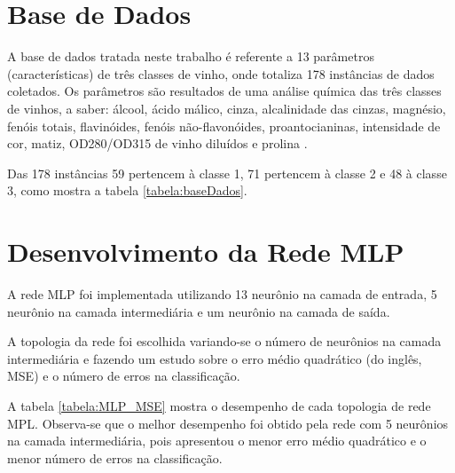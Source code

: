 
\section{Base de Dados} \label{baseDados}

A base de dados tratada neste trabalho é referente a 13 parâmetros (características) de três classes de vinho, onde totaliza 178 instâncias de dados coletados. Os parâmetros são resultados de uma análise química das três classes de vinhos, a saber: álcool, ácido málico, cinza, alcalinidade das cinzas, magnésio, fenóis totais, flavinóides, fenóis não-flavonóides, proantocianinas, intensidade de cor, matiz, OD280/OD315 de vinho diluídos e prolina \cite{fraley2007model}.



Das 178 instâncias 59 pertencem à classe 1, 71 pertencem à classe 2 e 48 à classe 3, como mostra a tabela \ref{tabela:baseDados}.





\section{Desenvolvimento da Rede MLP} \label{desenvolvimentoMLP}

A rede MLP foi implementada utilizando 13 neurônio na camada de entrada, 5 neurônio na camada intermediária e um neurônio na camada de saída.

A topologia da rede foi escolhida variando-se o número de neurônios na camada intermediária e fazendo um estudo sobre o erro médio quadrático (do inglês, MSE) e o número de erros na classificação.


A tabela \ref{tabela:MLP_MSE} mostra o desempenho de cada topologia de rede MPL. Observa-se que o melhor desempenho foi obtido pela rede com 5 neurônios na camada intermediária, pois apresentou o menor erro médio quadrático e o menor número de erros na classificação.


